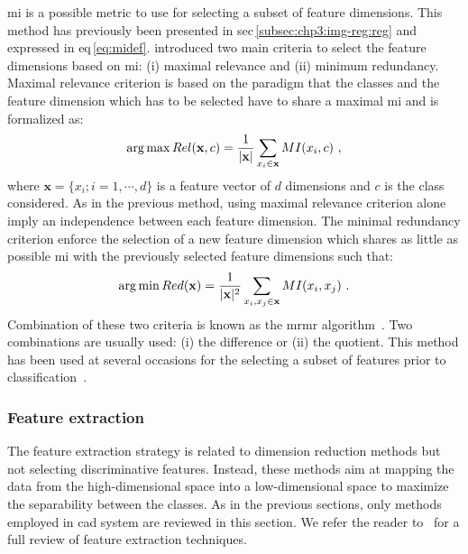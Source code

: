 \Ac{mi} is a possible metric to use for selecting a subset of feature dimensions.
This method has previously been presented in \acs{sec}\,\ref{subsec:chp3:img-reg:reg} and expressed in \acs{eq}\,\eqref{eq:midef}.
\citeauthor{Peng2005} introduced two main criteria to select the feature dimensions based on \ac{mi}: (i) maximal relevance and (ii) minimum redundancy.
Maximal relevance criterion is based on the paradigm that the classes and the feature dimension which has to be selected have to share a maximal \ac{mi} and is formalized as:
\begin{equation}
  \operatorname*{arg\,max} Rel(\mathbf{x},c) = \frac{1}{|\mathbf{x}|} \sum_{x_i \in \mathbf{x}} MI(x_i,c)  \ , 
  \label{eq:mRel}
\end{equation}
\noindent where $\mathbf{x} = \{x_i; i=1,\cdots,d\}$ is a feature vector of $d$ dimensions and $c$ is the class considered.
As in the previous method, using maximal relevance criterion alone imply an independence between each feature dimension.
The minimal redundancy criterion enforce the selection of a new feature dimension which shares as little as possible \ac{mi} with the previously selected feature dimensions such that:
\begin{equation}
  \operatorname*{arg\,min} Red(\mathbf{x}) = \frac{1}{|\mathbf{x}|^2} \sum_{x_i,x_j \in \mathbf{x}} MI(x_i,x_j)  \ . 
  \label{eq:mRed}
\end{equation}
Combination of these two criteria is known as the \ac{mrmr} algorithm~\cite{Peng2005}.
Two combinations are usually used: (i) the difference or (ii) the quotient.
This method has been used at several occasions for the selecting a subset of features prior to classification~\cite{Niaf2011,Niaf2012,lehaire2014computer,Viswanath2012,khalvati2015automated,chung2015prostate}.

\subsubsection{Feature extraction}\label{subsubsec:chp3:img-clas:CADX:fea-ext:ext}
The feature extraction strategy is related to dimension reduction methods but not selecting discriminative features.
Instead, these methods aim at mapping the data from the high-dimensional space into a low-dimensional space to maximize the separability between the classes.
As in the previous sections, only methods employed in \ac{cad} system are reviewed in this section.
We refer the reader to~\cite{Fodor2002} for a full review of feature extraction techniques.

